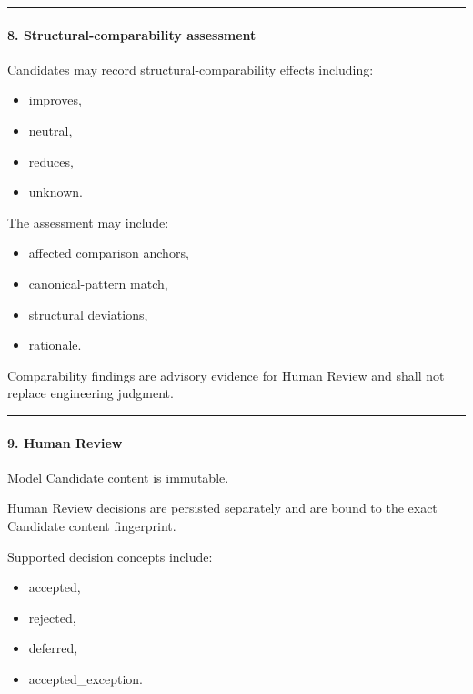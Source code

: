 \begin{center}\rule{0.5\linewidth}{0.5pt}\end{center}

\hypertarget{8-structural-comparability-assessment}{%
\paragraph{8. Structural-comparability assessment}\label{8-structural-comparability-assessment}}

Candidates may record structural-comparability effects including:

\begin{itemize}
\tightlist
\item
  improves,
\item
  neutral,
\item
  reduces,
\item
  unknown.
\end{itemize}

The assessment may include:

\begin{itemize}
\tightlist
\item
  affected comparison anchors,
\item
  canonical-pattern match,
\item
  structural deviations,
\item
  rationale.
\end{itemize}

Comparability findings are advisory evidence for Human Review and shall not replace engineering judgment.

\begin{center}\rule{0.5\linewidth}{0.5pt}\end{center}

\hypertarget{9-human-review}{%
\paragraph{9. Human Review}\label{9-human-review}}

Model Candidate content is immutable.

Human Review decisions are persisted separately and are bound to the exact Candidate content fingerprint.

Supported decision concepts include:

\begin{itemize}
\tightlist
\item
  accepted,
\item
  rejected,
\item
  deferred,
\item
  accepted\_exception.
\end{itemize}

